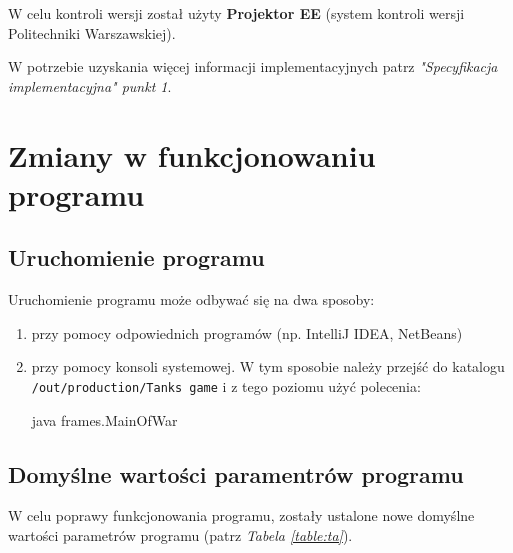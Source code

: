 \documentclass[a4paper]{article}
\begin{document}
W celu kontroli wersji zosta\l{} u\.zyty \textbf{Projektor EE} (system kontroli wersji Politechniki Warszawskiej). 

W potrzebie uzyskania wi\k{e}cej informacji implementacyjnych patrz \textit{"Specyfikacja implementacyjna" punkt 1}.

\section{Zmiany w funkcjonowaniu programu}

\subsection{Uruchomienie programu}
\quad Uruchomienie programu mo\.ze odbywa\'c si\k{e} na dwa sposoby:
\begin{enumerate}
    \item przy pomocy odpowiednich program\'ow (np. IntelliJ IDEA, NetBeans)
    \item przy pomocy konsoli systemowej. W tym sposobie nale\.zy przej\'s\'c do katalogu \texttt{/out/production/Tanks game} i z tego poziomu u\.zy\'c polecenia:
    \begin{center}
        java frames.MainOfWar
    \end{center}
    
\end{enumerate}

\subsection{Domy\'slne warto\'sci paramentr\'ow programu}
\quad W celu poprawy funkcjonowania programu, zosta\l{}y ustalone nowe domy\'slne warto\'sci parametr\'ow programu (patrz \textit{Tabela \ref{table:ta}}).
\end{document}
